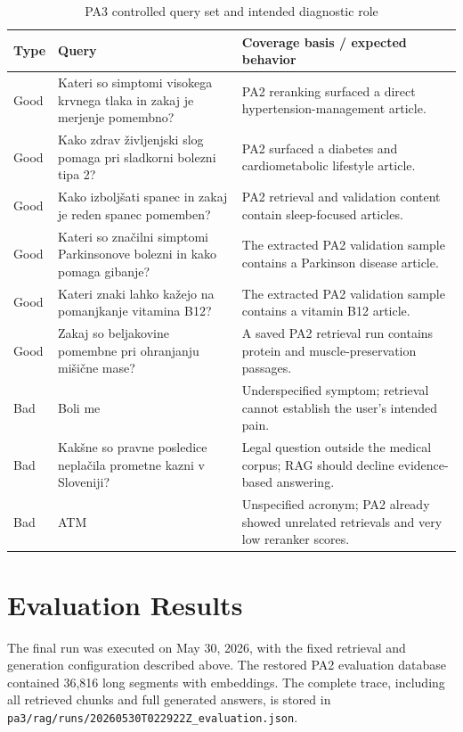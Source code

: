 \documentclass[9pt]{IEEEtran}
\begin{document}
\begin{table}[t]
\centering
\small
\caption{PA3 controlled query set and intended diagnostic role}
\label{tab:queries}
\begin{tabular}{p{2.2cm}p{6.0cm}p{7.0cm}}
\toprule
\textbf{Type} & \textbf{Query} & \textbf{Coverage basis / expected behavior} \\
\midrule
Good & Kateri so simptomi visokega krvnega tlaka in zakaj je merjenje pomembno? &
PA2 reranking surfaced a direct hypertension-management article. \\
Good & Kako zdrav življenjski slog pomaga pri sladkorni bolezni tipa 2? &
PA2 surfaced a diabetes and cardiometabolic lifestyle article. \\
Good & Kako izboljšati spanec in zakaj je reden spanec pomemben? &
PA2 retrieval and validation content contain sleep-focused articles. \\
Good & Kateri so značilni simptomi Parkinsonove bolezni in kako pomaga gibanje? &
The extracted PA2 validation sample contains a Parkinson disease article. \\
Good & Kateri znaki lahko kažejo na pomanjkanje vitamina B12? &
The extracted PA2 validation sample contains a vitamin B12 article. \\
Good & Zakaj so beljakovine pomembne pri ohranjanju mišične mase? &
A saved PA2 retrieval run contains protein and muscle-preservation passages. \\
\midrule
Bad & Boli me &
Underspecified symptom; retrieval cannot establish the user's intended pain. \\
Bad & Kakšne so pravne posledice neplačila prometne kazni v Sloveniji? &
Legal question outside the medical corpus; RAG should decline evidence-based answering. \\
Bad & ATM &
Unspecified acronym; PA2 already showed unrelated retrievals and very low reranker scores. \\
\bottomrule
\end{tabular}
\end{table}

\section{Evaluation Results}
The final run was executed on May 30, 2026, with the fixed retrieval and
generation configuration described above.  The restored PA2 evaluation
database contained 36,816 long segments with embeddings.  The complete trace,
including all retrieved chunks and full generated answers, is stored in
\texttt{pa3/rag/runs/20260530T022922Z\_evaluation.json}.
\end{document}
